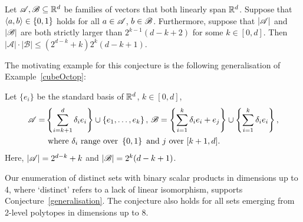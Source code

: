 \begin{conjecture}\label{generalisation}
    Let ${\mathscr{A}},{\mathscr{B}} \subseteq {\mathbb{R}}^d$ be families of vectors that both linearly span ${\mathbb{R}}^d$. Suppose that $\langle a, b\rangle \in \{0,1\}$ holds for all $a \in {\mathscr{A}}$, $b \in {\mathscr{B}}$. Furthermore, suppose that $|{\mathscr{A}}|$ and $|{\mathscr{B}}|$ are both strictly larger than $2^{k-1}(d-k+2)$ for some $k\in [0,d]$. Then $\left|\mathcal{A}\right| \cdot\left|\mathcal{B}\right| \leq (2^{d-k}+k)2^k(d-k+1)$.
\end{conjecture}
The motivating example for this conjecture is the following generalisation of Example~\ref{cubeOctop}:
\begin{example}\label{generalCubeOctop}
    Let $\{e_i\}$ be the standard basis of ${\mathbb{R}}^d$, $k\in [0,d]$,
    \begin{align*}
        {\mathscr{A}}= & \left\{\sum_{i=k+1}^{d}\delta_i e_i\right\}\cup\left\{e_1,\ldots,e_k\right\},\,{\mathscr{B}}=\left\{\sum_{i=1}^{k}\delta_i e_i + e_j\right\}\cup\left\{\sum_{i=1}^{k}\delta_i e_i\right\}, \\
        & \text{ where } \delta_i\text{ range over }\left\{0, 1\right\} \text{ and }j\text{ over }[k+1,d].
    \end{align*}
    Here, $|{\mathscr{A}}|=2^{d-k}+k$ and $|{\mathscr{B}}|=2^k (d-k+1)$.
\end{example}
Our enumeration of distinct sets with binary scalar products in dimensions up to 4, where `distinct' refers to a lack of linear isomorphism, supports Conjecture~\ref{generalisation}. The conjecture also holds for all sets emerging from 2-level polytopes in dimensions up to 8.

